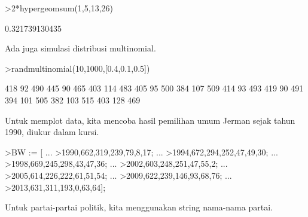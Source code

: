 \documentclass[12pt,arial,letterpaper]{book}
\begin{document}
\begin{eulercomment}
\begin{eulercomment}
\begin{eulercomment}
\begin{eulercomment}
\begin{eulercomment}
\begin{eulercomment}
\begin{eulercomment}
\begin{eulercomment}
\begin{eulercomment}
\begin{eulercomment}
\begin{eulercomment}
\begin{eulercomment}
\begin{eulercomment}
\begin{eulercomment}
\begin{eulercomment}
\begin{eulercomment}
\begin{eulercomment}
\begin{eulercomment}
\begin{eulercomment}
\begin{eulercomment}
\begin{eulercomment}
\begin{eulercomment}
\begin{eulercomment}
\begin{eulercomment}
\begin{eulercomment}
\begin{eulercomment}
\begin{eulercomment}
\begin{eulercomment}
\begin{eulercomment}
\begin{eulercomment}
\begin{eulercomment}
\begin{eulercomment}
\begin{eulercomment}
\end{eulercomment}
\begin{eulerprompt}
>2*hypergeomsum(1,5,13,26)
\end{eulerprompt}
\begin{euleroutput}
  0.321739130435
\end{euleroutput}
\begin{eulercomment}
Ada juga simulasi distribusi multinomial.
\end{eulercomment}
\begin{eulerprompt}
>randmultinomial(10,1000,[0.4,0.1,0.5])
\end{eulerprompt}
\begin{euleroutput}
            418            92           490 
            445            90           465 
            403           114           483 
            405            95           500 
            384           107           509 
            414            93           493 
            419            90           491 
            394           101           505 
            382           103           515 
            403           128           469 
\end{euleroutput}
\begin{eulercomment}
Untuk memplot data, kita mencoba hasil pemilihan umum Jerman sejak
tahun 1990, diukur dalam kursi.
\end{eulercomment}
\begin{eulerprompt}
>BW := [ ...
>1990,662,319,239,79,8,17; ...
>1994,672,294,252,47,49,30; ...
>1998,669,245,298,43,47,36; ...
>2002,603,248,251,47,55,2; ...
>2005,614,226,222,61,51,54; ...
>2009,622,239,146,93,68,76; ...
>2013,631,311,193,0,63,64];
\end{eulerprompt}
\begin{eulercomment}
Untuk partai-partai politik, kita menggunakan string nama-nama partai.
\end{eulercomment}
\begin{eulerprompt}

\end{eulerprompt}
\end{eulercomment}
\end{eulercomment}
\end{eulercomment}
\end{eulercomment}
\end{eulercomment}
\end{eulercomment}
\end{eulercomment}
\end{eulercomment}
\end{eulercomment}
\end{eulercomment}
\end{eulercomment}
\end{eulercomment}
\end{eulercomment}
\end{eulercomment}
\end{eulercomment}
\end{eulercomment}
\end{eulercomment}
\end{eulercomment}
\end{eulercomment}
\end{eulercomment}
\end{eulercomment}
\end{eulercomment}
\end{eulercomment}
\end{eulercomment}
\end{eulercomment}
\end{eulercomment}
\end{eulercomment}
\end{eulercomment}
\end{eulercomment}
\end{eulercomment}
\end{eulercomment}
\end{eulercomment}
\end{document}
